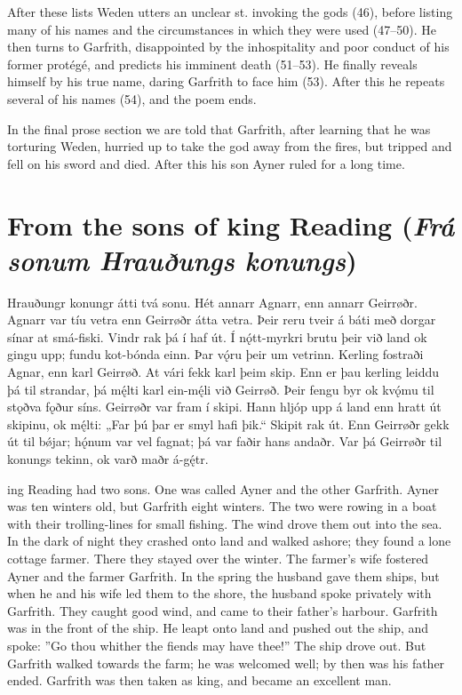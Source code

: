 After these lists Weden utters an unclear st. invoking the gods (46), before listing many of his names and the circumstances in which they were used (47–50). He then turns to Garfrith, disappointed by the inhospitality and poor conduct of his former protégé, and predicts his imminent death (51–53). He finally reveals himself by his true name, daring Garfrith to face him (53). After this he repeats several of his names (54), and the poem ends.

In the final prose section we are told that Garfrith, after learning that he was torturing Weden, hurried up to take the god away from the fires, but tripped and fell on his sword and died. After this his son Ayner ruled for a long time.

\sectionline

\section{From the sons of king Reading (\emph{Frá sonum Hrauðungs konungs})}

\bpg\bpa{}%
Hrauðungr konungr átti tvá sonu. Hét annarr Agnarr, enn annarr Geirrøðr.
Agnarr var tíu vetra enn Geirrøðr átta vetra. Þeir reru tveir á báti með dorgar sínar at smá-fiski.
Vindr rak þá í haf út. Í nǫ́tt-myrkri brutu þeir við land ok gingu upp; fundu kot-bónda einn.
Þar vǫ́ru þeir um vetrinn. Kerling fostraði Agnar, enn karl Geirrøð.
At vári fekk karl þeim skip. Enn er þau kerling leiddu þá til strandar, þá mę́lti karl ein-mę́li við Geirrøð.
Þeir fengu byr ok kvǫ́mu til stǫðva fǫður síns. Geirrøðr var fram í skipi.
Hann hljóp upp á land enn hratt út skipinu, ok mę́lti: „Far þú þar er smyl hafi þik.“
Skipit rak út. Enn Geirrøðr gekk út til bǿjar; hǫ́num var vel fagnat; þá var faðir hans andaðr.
Var þá Geirrøðr til konungs tekinn, ok varð maðr á-gę́tr.\epa

ing Reading had two sons. One was called Ayner and the other Garfrith.
Ayner was ten winters old, but Garfrith eight winters. The two were rowing in a boat with their trolling-lines for small fishing.
The wind drove them out into the sea. In the dark of night they crashed onto land and walked ashore; they found a lone cottage farmer.
There they stayed over the winter. The farmer’s wife fostered Ayner and the farmer Garfrith.
In the spring the husband gave them ships, but when he and his wife led them to the shore, the husband spoke privately with Garfrith.
They caught good wind, and came to their father’s harbour. Garfrith was in the front of the ship.
He leapt onto land and pushed out the ship, and spoke: ”Go thou whither the fiends may have thee!”
The ship drove out. But Garfrith walked towards the farm; he was welcomed well; by then was his father ended.
Garfrith was then taken as king, and became an excellent man.\epb\epg


